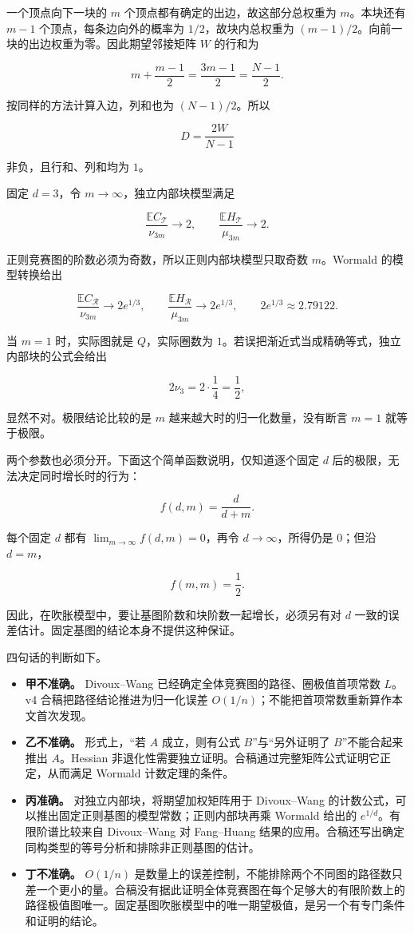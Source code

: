 \documentclass[11pt,a4paper]{article}
\providecommand{\tightlist}{\setlength{\itemsep}{0pt}\setlength{\parskip}{0pt}}
\begin{document}
一个顶点向下一块的 \(m\) 个顶点都有确定的出边，故这部分总权重为 \(m\)。本块还有 \(m-1\) 个顶点，每条边向外的概率为 \(1/2\)，故块内总权重为 \((m-1)/2\)。向前一块的出边权重为零。因此期望邻接矩阵 \(W\) 的行和为

\[m+\frac{m-1}{2}=\frac{3m-1}{2}=\frac{N-1}{2}.\]

按同样的方法计算入边，列和也为 \((N-1)/2\)。所以

\[D=\frac{2W}{N-1}\]

非负，且行和、列和均为 \(1\)。

固定 \(d=3\)，令 \(m\to\infty\)，独立内部块模型满足

\[\frac{\mathbb EC_{\mathcal T}}{\nu_{3m}}\longrightarrow2,
\qquad
\frac{\mathbb EH_{\mathcal T}}{\mu_{3m}}\longrightarrow2.\]

正则竞赛图的阶数必须为奇数，所以正则内部块模型只取奇数 \(m\)。Wormald 的模型转换给出

\[\frac{\mathbb EC_{\mathcal R}}{\nu_{3m}}
\longrightarrow2e^{1/3},
\qquad
\frac{\mathbb EH_{\mathcal R}}{\mu_{3m}}
\longrightarrow2e^{1/3},
\qquad
2e^{1/3}\approx2.79122.\]

当 \(m=1\) 时，实际图就是 \(Q\)，实际圈数为 \(1\)。若误把渐近式当成精确等式，独立内部块的公式会给出

\[2\nu_3=2\cdot\frac14=\frac12,\]

显然不对。极限结论比较的是 \(m\) 越来越大时的归一化数量，没有断言 \(m=1\) 就等于极限。

两个参数也必须分开。下面这个简单函数说明，仅知道逐个固定 \(d\) 后的极限，无法决定同时增长时的行为：

\[f(d,m)=\frac{d}{d+m}.\]

每个固定 \(d\) 都有 \(\lim_{m\to\infty}f(d,m)=0\)，再令 \(d\to\infty\)，所得仍是 \(0\)；但沿 \(d=m\)，

\[f(m,m)=\frac12.\]

因此，在吹胀模型中，要让基图阶数和块阶数一起增长，必须另有对 \(d\) 一致的误差估计。固定基图的结论本身不提供这种保证。

四句话的判断如下。

\begin{itemize}
\tightlist
\item
  \textbf{甲不准确。} Divoux--Wang 已经确定全体竞赛图的路径、圈极值首项常数 \(L\)。v4 合稿把路径结论推进为归一化误差 \(O(1/n)\)；不能把首项常数重新算作本文首次发现。
\item
  \textbf{乙不准确。} 形式上，``若 \(A\) 成立，则有公式 \(B\)''与``另外证明了 \(B\)''不能合起来推出 \(A\)。Hessian 非退化性需要独立证明。合稿通过完整矩阵公式证明它正定，从而满足 Wormald 计数定理的条件。
\item
  \textbf{丙准确。} 对独立内部块，将期望加权矩阵用于 Divoux--Wang 的计数公式，可以推出固定正则基图的模型常数；正则内部块再乘 Wormald 给出的 \(e^{1/d}\)。有限阶谱比较来自 Divoux--Wang 对 Fang--Huang 结果的应用。合稿还写出确定同构类型的等号分析和排除非正则基图的估计。
\item
  \textbf{丁不准确。} \(O(1/n)\) 是数量上的误差控制，不能排除两个不同图的路径数只差一个更小的量。合稿没有据此证明全体竞赛图在每个足够大的有限阶数上的路径极值图唯一。固定基图吹胀模型中的唯一期望极值，是另一个有专门条件和证明的结论。
\end{itemize}
\end{document}
